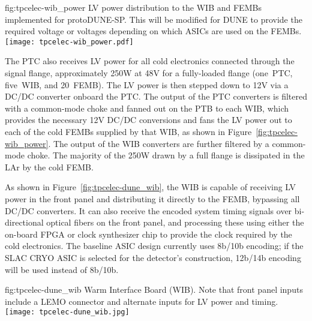 \begin{dunefigure}
{fig:tpcelec-wib_power}
{LV power distribution to the WIB and FEMBs implemented for protoDUNE-SP. This will be modified for DUNE to provide the required voltage or voltages depending on which ASICs are used on the FEMBs.}
\texttt{[image: tpcelec-wib\_power.pdf]}
\end{dunefigure}

The PTC also receives LV power for all cold
electronics connected through the signal flange, approximately 250W at 48V for a
fully-loaded flange (one~PTC, five~WIB, and 20~FEMB). The LV power is then stepped down
to 12V via a DC/DC converter onboard the PTC. The output of the PTC converters is filtered with a common-mode choke and fanned out
on the PTB to each WIB, which provides the necessary 12V DC/DC conversions and fans
the LV power out to each of the cold FEMBs supplied by that WIB, 
as shown in Figure~\ref{fig:tpcelec-wib_power}. The output of the WIB converters are further filtered by a common-mode choke. The 
majority of the 250W drawn by a full flange is dissipated in the LAr
by the cold FEMB.


As shown in Figure~\ref{fig:tpcelec-dune_wib}, the WIB is capable of receiving LV power in the front panel and distributing it directly to the FEMB, bypassing all DC/DC converters.
It can also receive the encoded system timing signals over bi-directional optical
fibers on the front panel, and processing these using either
the on-board FPGA or clock synthesizer chip to provide the clock required by the cold electronics.
The baseline ASIC design currently uses 8b/10b encoding; if the SLAC CRYO ASIC is selected for
the detector's construction, 12b/14b encoding will be used instead of 8b/10b.

\begin{dunefigure}
{fig:tpcelec-dune_wib}
{Warm Interface Board (WIB). Note that front panel inputs include a LEMO connector and alternate inputs for LV power and timing.}
\texttt{[image: tpcelec-dune\_wib.jpg]}
\end{dunefigure}


